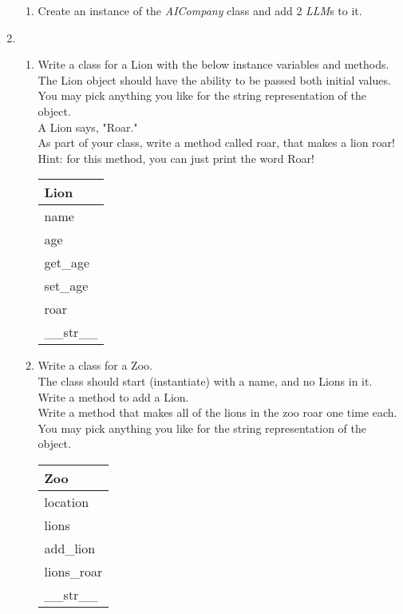 \documentclass{article}
\begin{document}
\begin{enumerate}
\begin{enumerate}
		\item
			Create an instance of the \textit{AICompany} class and add 2 \textit{LLM}s to it.
	\end{enumerate}
\pagebreak



	\item
	\begin{enumerate}
		\item
			Write a class for a Lion with the below instance variables and methods.\\ 
			The Lion object should have the ability to be passed both initial values.\\  
			You may pick anything you like for the string representation of the object.\\
			A Lion says, "Roar."\\  
			As part of your class, write a method called roar, that makes a lion roar!\\
			Hint: for this method, you can just print the word Roar!
			\begin{flushright}
			\begin{tabular}{|l|}
				\hline
				Lion\\ \hline
				name\\	age\\	 \hline
				get\_age \\ set\_age \\ roar \\ \_\_str\_\_ \\ \hline
			\end{tabular}
			\end{flushright}

		\item
			Write a class for a Zoo. \\
			The class should start (instantiate) with a name, and no Lions in it. \\ 
			Write a method to add a Lion.\\
			Write a method that makes all of the lions in the zoo roar one time each.\\
			You may pick anything you like for the string representation of the object.
	
			\begin{flushright}
			\begin{tabular}{|l|}
				\hline
				Zoo\\ \hline  	%
				location\\ lions\\ \hline		%
				add\_lion\\ lions\_roar \\ \_\_str\_\_ \\ \hline		%
			\end{tabular}
			\end{flushright}


\end{enumerate}
\end{enumerate}
\end{document}
